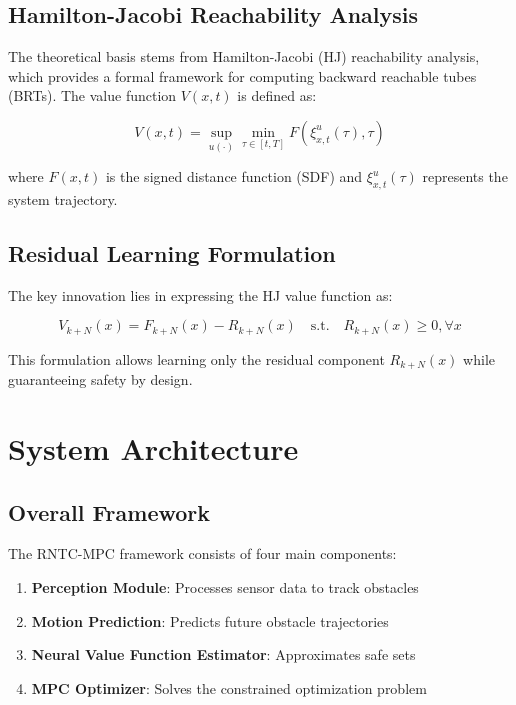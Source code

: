 \documentclass[12pt,a4paper]{article}
\begin{document}
\subsection{Hamilton-Jacobi Reachability Analysis}
The theoretical basis stems from Hamilton-Jacobi (HJ) reachability analysis, which provides a formal framework for computing backward reachable tubes (BRTs). The value function $V(x,t)$ is defined as:

\begin{equation}
V(x,t) = \sup_{u(\cdot)} \min_{\tau \in [t,T]} F(\xi_{x,t}^u(\tau), \tau)
\end{equation}

where $F(x,t)$ is the signed distance function (SDF) and $\xi_{x,t}^u(\tau)$ represents the system trajectory.

\subsection{Residual Learning Formulation}
The key innovation lies in expressing the HJ value function as:

\begin{equation}
V_{k+N}(x) = F_{k+N}(x) - R_{k+N}(x) \quad \text{s.t.} \quad R_{k+N}(x) \geq 0, \forall x
\end{equation}

This formulation allows learning only the residual component $R_{k+N}(x)$ while guaranteeing safety by design.

\section{System Architecture}

\subsection{Overall Framework}
The RNTC-MPC framework consists of four main components:

\begin{enumerate}
    \item \textbf{Perception Module}: Processes sensor data to track obstacles
    \item \textbf{Motion Prediction}: Predicts future obstacle trajectories
    \item \textbf{Neural Value Function Estimator}: Approximates safe sets
    \item \textbf{MPC Optimizer}: Solves the constrained optimization problem
\end{enumerate}
\end{document}
